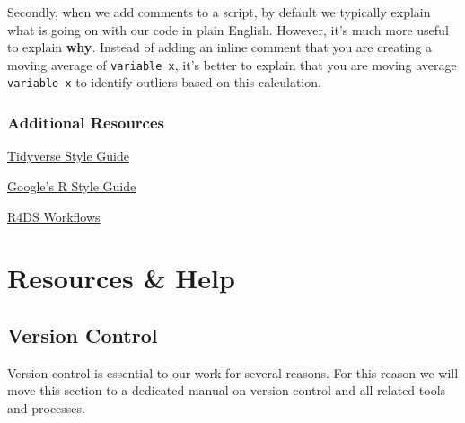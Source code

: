 \documentclass[
  letterpaper,
  DIV=11,
  numbers=noendperiod]{scrreprt}
\begin{document}
Secondly, when we add comments to a script, by default we typically
explain what is going on with our code in plain English. However, it's
much more useful to explain \textbf{why}. Instead of adding an inline
comment that you are creating a moving average of \texttt{variable\ x},
it's better to explain that you are moving average \texttt{variable\ x}
to identify outliers based on this calculation.

\hypertarget{additional-resources-4}{%
\section{Additional Resources}\label{additional-resources-4}}

\href{https://style.tidyverse.org/}{Tidyverse Style Guide}

\href{https://google.github.io/styleguide/Rguide.html}{Google's R Style
Guide}

\href{https://r4ds.had.co.nz/workflow-scripts.html}{R4DS Workflows}

\part{Resources \& Help}

\hypertarget{version-control}{%
\chapter{Version Control}\label{version-control}}

Version control is essential to our work for several reasons. For this
reason we will move this section to a dedicated manual on version
control and all related tools and processes.
\end{document}
